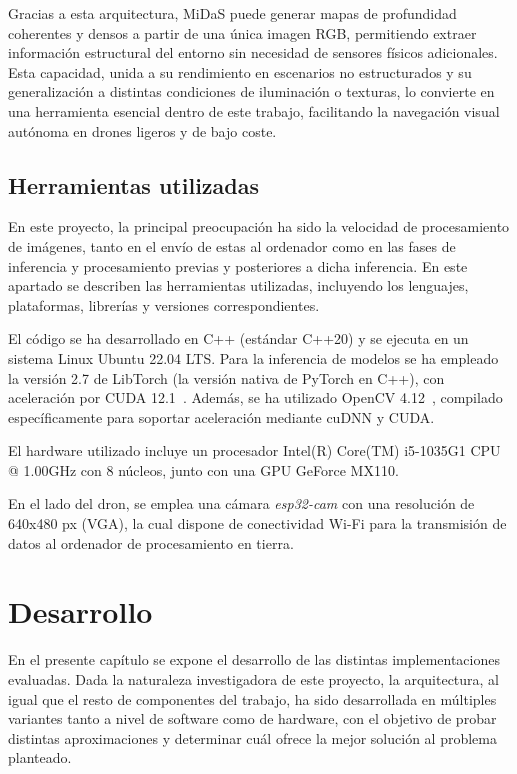 Gracias a esta arquitectura, MiDaS puede generar mapas de profundidad coherentes y densos a partir de una única imagen RGB, permitiendo extraer información estructural del entorno sin necesidad de sensores físicos adicionales. Esta capacidad, unida a su rendimiento en escenarios no estructurados y su generalización a distintas condiciones de iluminación o texturas, lo convierte en una herramienta esencial dentro de este trabajo, facilitando la navegación visual autónoma en drones ligeros y de bajo coste.

    \section{Herramientas utilizadas}
En este proyecto, la principal preocupación ha sido la velocidad de procesamiento de imágenes, tanto en el envío de estas al ordenador como en las fases de inferencia y procesamiento previas y posteriores a dicha inferencia. En este apartado se describen las herramientas utilizadas, incluyendo los lenguajes, plataformas, librerías y versiones correspondientes.

El código se ha desarrollado en C++ (estándar C++20) y se ejecuta en un sistema Linux Ubuntu 22.04 LTS. Para la inferencia de modelos se ha empleado la versión 2.7 de LibTorch (la versión nativa de PyTorch en C++), con aceleración por CUDA 12.1~\cite{cuda_opencv_repo}. Además, se ha utilizado OpenCV 4.12~\cite{opencv_repo}, compilado específicamente para soportar aceleración mediante cuDNN y CUDA.

El hardware utilizado incluye un procesador Intel(R) Core(TM) i5-1035G1 CPU @ 1.00GHz con 8 núcleos, junto con una GPU GeForce MX110.

En el lado del dron, se emplea una cámara \textit{esp32-cam} con una resolución de 640x480 px (VGA), la cual dispone de conectividad Wi-Fi para la transmisión de datos al ordenador de procesamiento en tierra.

  \chapter{Desarrollo}
En el presente capítulo se expone el desarrollo de las distintas implementaciones evaluadas. Dada la naturaleza investigadora de este proyecto, la arquitectura, al igual que el resto de componentes del trabajo, ha sido desarrollada en múltiples variantes tanto a nivel de software como de hardware, con el objetivo de probar distintas aproximaciones y determinar cuál ofrece la mejor solución al problema planteado.
